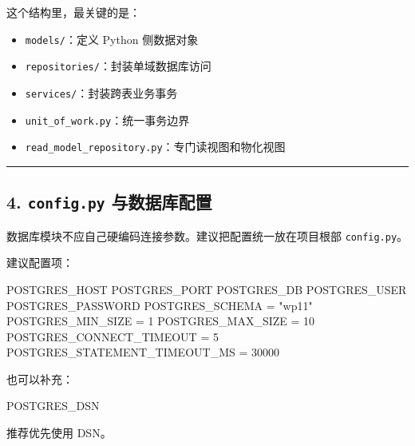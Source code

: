 \documentclass[UTF8]{ctexart}
\newenvironment{Shaded}{}{}
\newcommand{\DecValTok}[1]{\textcolor[rgb]{0.25,0.63,0.44}{#1}}
\newcommand{\NormalTok}[1]{#1}
\newcommand{\OperatorTok}[1]{\textcolor[rgb]{0.40,0.40,0.40}{#1}}
\newcommand{\StringTok}[1]{\textcolor[rgb]{0.25,0.44,0.63}{#1}}
\providecommand{\tightlist}{%
  \setlength{\itemsep}{0pt}\setlength{\parskip}{0pt}}
\begin{document}
这个结构里，最关键的是：

\begin{itemize}
\tightlist
\item
  \texttt{models/}：定义 Python 侧数据对象
\item
  \texttt{repositories/}：封装单域数据库访问
\item
  \texttt{services/}：封装跨表业务事务
\item
  \texttt{unit\_of\_work.py}：统一事务边界
\item
  \texttt{read\_model\_repository.py}：专门读视图和物化视图
\end{itemize}

\begin{center}\rule{0.5\linewidth}{0.5pt}\end{center}

\hypertarget{config.py-ux4e0eux6570ux636eux5e93ux914dux7f6e}{%
\subsection{\texorpdfstring{4. \texttt{config.py}
与数据库配置}{4. config.py 与数据库配置}}\label{config.py-ux4e0eux6570ux636eux5e93ux914dux7f6e}}

数据库模块不应自己硬编码连接参数。建议把配置统一放在项目根部
\texttt{config.py}。

建议配置项：

\begin{Shaded}
\begin{Highlighting}[]
\NormalTok{POSTGRES\_HOST}
\NormalTok{POSTGRES\_PORT}
\NormalTok{POSTGRES\_DB}
\NormalTok{POSTGRES\_USER}
\NormalTok{POSTGRES\_PASSWORD}
\NormalTok{POSTGRES\_SCHEMA }\OperatorTok{=} \StringTok{"wp11"}
\NormalTok{POSTGRES\_MIN\_SIZE }\OperatorTok{=} \DecValTok{1}
\NormalTok{POSTGRES\_MAX\_SIZE }\OperatorTok{=} \DecValTok{10}
\NormalTok{POSTGRES\_CONNECT\_TIMEOUT }\OperatorTok{=} \DecValTok{5}
\NormalTok{POSTGRES\_STATEMENT\_TIMEOUT\_MS }\OperatorTok{=} \DecValTok{30000}
\end{Highlighting}
\end{Shaded}

也可以补充：

\begin{Shaded}
\begin{Highlighting}[]
\NormalTok{POSTGRES\_DSN}
\end{Highlighting}
\end{Shaded}

推荐优先使用 DSN。
\end{document}
